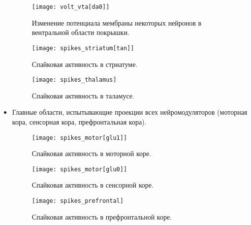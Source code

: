 \begin{itemize}
\begin{figure}
	\centering
	\texttt{[image: volt\_vta[da0]]}
	\caption{Изменение потенциала мембраны некоторых нейронов в вентральной области покрышки.}
	\label{fig:volt_vta}
\end{figure}

\begin{figure}
	\centering
	\texttt{[image: spikes\_striatum[tan]]}
	\caption{Спайковая активность в стриатуме.}
	\label{fig:spikes_striatum}
\end{figure}

\begin{figure}
	\centering
	\texttt{[image: spikes\_thalamus]}
	\caption{Спайковая активность в таламусе.}
	\label{fig:spikes_thalamus}
\end{figure}


\item Главные области, испытывающие проекции всех нейромодуляторов (моторная кора, сенсорная кора, префронтальная кора).

\begin{figure}
	\centering
	\texttt{[image: spikes\_motor[glu1]]}
	\caption{Спайковая активность в моторной коре.}
	\label{fig:spikes_motor}
\end{figure}

\begin{figure}
	\centering
	\texttt{[image: spikes\_motor[glu0]]}
	\caption{Спайковая активность в сенсорной коре.}
	\label{fig:spikes_sensory}
\end{figure}


\begin{figure}
	\centering
	\texttt{[image: spikes\_prefrontal]}
	\caption{Спайковая активность в префронтальной коре.}
	\label{fig:spikes_prefrontal}
\end{figure}


\end{itemize}

